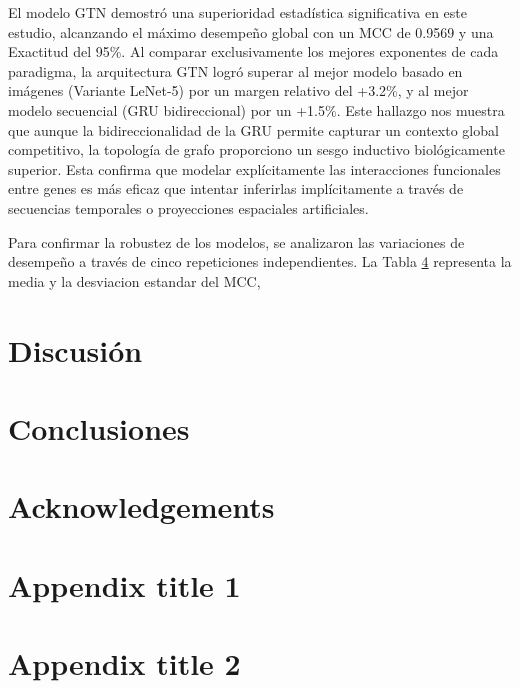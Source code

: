 \documentclass[preprint,number]{elsarticle}
\begin{document}
El modelo GTN demostró una superioridad estadística significativa en este estudio, alcanzando el máximo desempeño global con un MCC de 0.9569 y una Exactitud del 95\%. Al comparar exclusivamente los mejores exponentes de cada paradigma, la arquitectura GTN logró superar al mejor modelo basado en imágenes (Variante LeNet-5) por un margen relativo del +3.2\%, y al mejor modelo secuencial (GRU bidireccional) por un +1.5\%. Este hallazgo nos muestra que aunque la bidireccionalidad de la GRU permite capturar un contexto global competitivo, la topología de grafo proporciono un sesgo inductivo biológicamente superior. Esta confirma que modelar explícitamente las interacciones funcionales entre genes es más eficaz que intentar inferirlas implícitamente a través de secuencias temporales o proyecciones espaciales artificiales.

Para confirmar la robustez de los modelos, se analizaron las variaciones de desempeño a través de cinco repeticiones independientes. La Tabla \ref{} representa la media y la desviacion estandar del MCC, 


\section{Discusión}

\section{Conclusiones}


\section*{Acknowledgements}


\appendix

\section{Appendix title 1}

\section{Appendix title 2}

 







\end{document}
